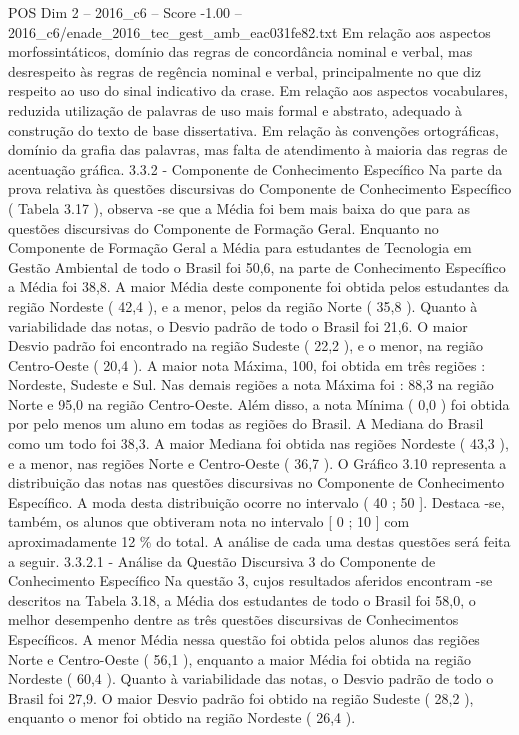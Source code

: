 \begin{textsample}{POS Dim 2 – 2016\_c6 – Score -1.00 – 2016\_c6/enade\_2016\_tec\_gest\_amb\_eac031fe82.txt}
Em relação aos aspectos morfossintáticos, domínio das regras de concordância nominal e verbal, mas desrespeito às regras de regência nominal e verbal, principalmente no que diz respeito ao uso do sinal indicativo da crase.
Em relação aos aspectos vocabulares, reduzida utilização de palavras de uso mais formal e abstrato, adequado à construção do texto de base dissertativa.
Em relação às convenções ortográficas, domínio da grafia das palavras, mas falta de atendimento à maioria das regras de acentuação gráfica. 3.3.2 - Componente de Conhecimento Específico Na parte da prova relativa às questões discursivas do Componente de Conhecimento Específico ( Tabela 3.17 ), observa -se que a Média foi bem mais baixa do que para as questões discursivas do Componente de Formação Geral.
Enquanto no Componente de Formação Geral a Média para estudantes de Tecnologia em Gestão Ambiental de todo o Brasil foi 50,6, na parte de Conhecimento Específico a Média foi 38,8.
A maior Média deste componente foi obtida pelos estudantes da região Nordeste ( 42,4 ), e a menor, pelos da região Norte ( 35,8 ).
Quanto à variabilidade das notas, o Desvio padrão de todo o Brasil foi 21,6.
O maior Desvio padrão foi encontrado na região Sudeste ( 22,2 ), e o menor, na região Centro-Oeste ( 20,4 ).
A maior nota Máxima, 100, foi obtida em três regiões : Nordeste, Sudeste e Sul.
Nas demais regiões a nota Máxima foi : 88,3 na região Norte e 95,0 na região Centro-Oeste.
Além disso, a nota Mínima ( 0,0 ) foi obtida por pelo menos um aluno em todas as regiões do Brasil.
A Mediana do Brasil como um todo foi 38,3.
A maior Mediana foi obtida nas regiões Nordeste ( 43,3 ), e a menor, nas regiões Norte e Centro-Oeste ( 36,7 ).
O Gráfico 3.10 representa a distribuição das notas nas questões discursivas no Componente de Conhecimento Específico.
A moda desta distribuição ocorre no intervalo ( 40 ; 50 ].
Destaca -se, também, os alunos que obtiveram nota no intervalo [ 0 ; 10 ] com aproximadamente 12 \% do total.
A análise de cada uma destas questões será feita a seguir. 3.3.2.1 - Análise da Questão Discursiva 3 do Componente de Conhecimento Específico Na questão 3, cujos resultados aferidos encontram -se descritos na Tabela 3.18, a Média dos estudantes de todo o Brasil foi 58,0, o melhor desempenho dentre as três questões discursivas de Conhecimentos Específicos.
A menor Média nessa questão foi obtida pelos alunos das regiões Norte e Centro-Oeste ( 56,1 ), enquanto a maior Média foi obtida na região Nordeste ( 60,4 ).
Quanto à variabilidade das notas, o Desvio padrão de todo o Brasil foi 27,9.
O maior Desvio padrão foi obtido na região Sudeste ( 28,2 ), enquanto o menor foi obtido na região Nordeste ( 26,4 ).

\end{textsample}

